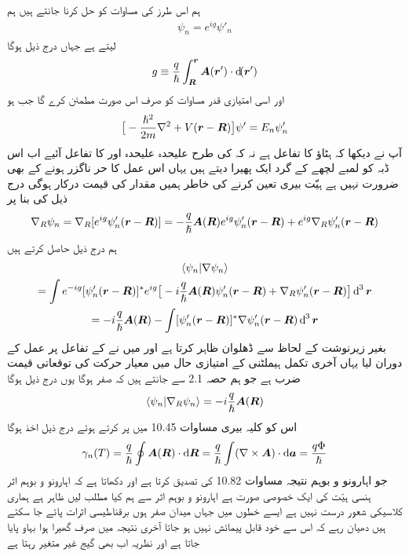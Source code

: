 ہم اس طرز کی مساوات کو حل کرنا جانتے ہیں ہم
\begin{align}
\psi_n = e^{i g} \psi'_n
\end{align}
لیتے ہے جہاں درج ذیل ہوگا 
\begin{align}
g \equiv \frac{q}{\hslash} \int_{\kvec{R}}^{\kvec{r}} \kvec{A} (\kvec{r}') \cdot \dif (\kvec{r}')
\end{align}
اور  اسی امتیازی قدر مساوات کو صرف اس صورت مطمئن کرے گا جب  ہو 
\begin{align}
\big [ - \frac{\hslash^2}{2m} \nabla^2 + V ({{\boldsymbol{r}}} - {{\boldsymbol{R}}}) \big ] \psi' = E_n \psi'_n
\end{align}
آپ نے دیکھا کہ  ہٹاؤ  کا تفاعل ہے نہ کہ  کی طرح علیحدہ علیحدہ  اور  کا تفاعل آئیے اب اس ڈبہ کو لمبے لچھے کے گرد ایک پھیرا دیتے ہیں یہاں اس عمل کا حر ناگزر ہونے کے بھی ضرورت نہیں ہے ہیّت بیری تعین کرنے کی خاطر ہمیں مقدار  کی قیمت درکار ہوگی درج ذیل کی بنا پر 
\begin{align*}
\nabla_R \psi_n = \nabla_R [e^{i g} \psi'_n ({{\boldsymbol{r}}} - {{\boldsymbol{R}}})] = - \frac{q}{\hslash} {{\boldsymbol{A}}} ({{\boldsymbol{R}}}) e^{i g} \psi'_n ({{\boldsymbol{r}}} - {{\boldsymbol{R}}}) + e^{i g} \nabla_R \psi'_n ({{\boldsymbol{r}}} - {{\boldsymbol{R}}})
\end{align*}
ہم درج ذیل حاصل کرتے ہیں 
\begin{multline}
\langle \psi_n | \nabla \psi_n \rangle \\
= \int e^{- i g} [\psi'_n (\kvec{r} - \kvec{R})]^{*} e^{i g} \big [ - i \frac{q}{\hslash} \kvec{A} (\kvec{R}) \psi'_n (\kvec{r} - \kvec{R}) + \nabla_R \psi'_n (\kvec{r} - \kvec{R}) \big ] \dif^{\,3} \kvec{r} \\
= - i \frac{q}{\hslash} \kvec{A} (\kvec{R}) - \int [\psi'_n (\kvec{r} - \kvec{R})]^{*} \nabla \psi'_n (\kvec{r} - \kvec{R}) \dif^{\,3} \kvec{r}
\end{multline}
بغیر زیرنوشت   کے لحاظ سے ڈھلوان ظاہر کرتا ہے اور میں نے  کے تفاعل پر عمل کے دوران  لیا یہاں آخری تکمل ہیملٹنی  کے امتیازی حال میں معیار حرکت کی توقعاتی قیمت ضرب   ہے جو ہم حصہ 2.1 سے جانتے ہیں کہ صفر ہوگا یوں درج ذیل ہوگا 
\begin{align}
\langle \psi_n | \nabla_R \psi_n \rangle = - i \frac{q}{\hslash} {{\boldsymbol{A}}} ({{\boldsymbol{R}}})
\end{align}
اس کو کلیہ بیری مساوات 10.45 میں پر کرتے ہوئے درج ذیل اخذ ہوگا 
\begin{align}
\gamma_n (T) = \frac{q}{\hslash} \oint \kvec{A} (\kvec{R}) \cdot \dif \kvec{R} = \frac{q}{\hslash} \int (\nabla \times \kvec{A}) \cdot \dif \kvec{a} = \frac{q \Phi}{\hslash}
\end{align}
جو اہارونو و بوہم نتیجہ مساوات 10.82 کی تصدیق کرتا ہے اور دکھاتا ہے کہ اہارونو و بوہم اثر ہنسی ہیّت کی ایک خصوصی صورت ہے اہارونو و بوہم اثر سے ہم کیا مطلب ليں ظاہر ہے ہماری کلاسیکی شعور درست نہیں ہے ایسے خطوں میں جہاں میدان صفر ہوں برقناطیسی اثرات پائے جا سکتے ہیں دھیان رہے کہ اس سے  خود قابل پیمائش نہیں ہو جاتا آخری نتیجہ میں صرف گھیرا ہوا بہاو پایا جاتا ہے اور نظریہ اب بھی گیج غیر متغیر رہتا ہے 

